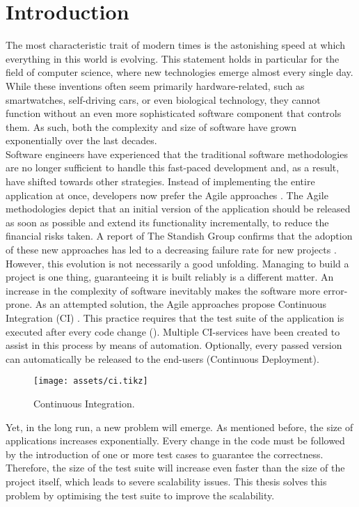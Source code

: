 
\section{Introduction}
\noindent The most characteristic trait of modern times is the astonishing speed at which everything in this world is evolving. This statement holds in particular for the field of computer science, where new technologies emerge almost every single day. While these inventions often seem primarily hardware-related, such as smartwatches, self-driving cars, or even biological technology, they cannot function without an even more sophisticated software component that controls them. As such, both the complexity and size of software have grown exponentially over the last decades.\\

\noindent Software engineers have experienced that the traditional software methodologies are no longer sufficient to handle this fast-paced development and, as a result, have shifted towards other strategies. Instead of implementing the entire application at once, developers now prefer the Agile approaches \cite{beck2001agile}. The Agile methodologies depict that an initial version of the application should be released as soon as possible and extend its functionality incrementally, to reduce the financial risks taken. A report of The Standish Group confirms that the adoption of these new approaches has led to a decreasing failure rate for new projects \cite{standish2015chaos}.\\

\noindent However, this evolution is not necessarily a good unfolding. Managing to build a project is one thing, guaranteeing it is built reliably is a different matter. An increase in the complexity of software inevitably makes the software more error-prone. As an attempted solution, the Agile approaches propose Continuous Integration (CI) \cite{SmartJenkinsDefinitive}. This practice requires that the test suite of the application is executed after every code change (). Multiple CI-services have been created to assist in this process by means of automation. Optionally, every passed version can automatically be released to the end-users (Continuous Deployment).

\begin{figure}[h!]
	\centering
	\texttt{[image: assets/ci.tikz]}
	\caption{Continuous Integration.}
	\label{fig:ext-en-ci}
\end{figure}

\noindent Yet, in the long run, a new problem will emerge. As mentioned before, the size of applications increases exponentially. Every change in the code must be followed by the introduction of one or more test cases to guarantee the correctness. Therefore, the size of the test suite will increase even faster than the size of the project itself, which leads to severe scalability issues. This thesis solves this problem by optimising the test suite to improve the scalability.